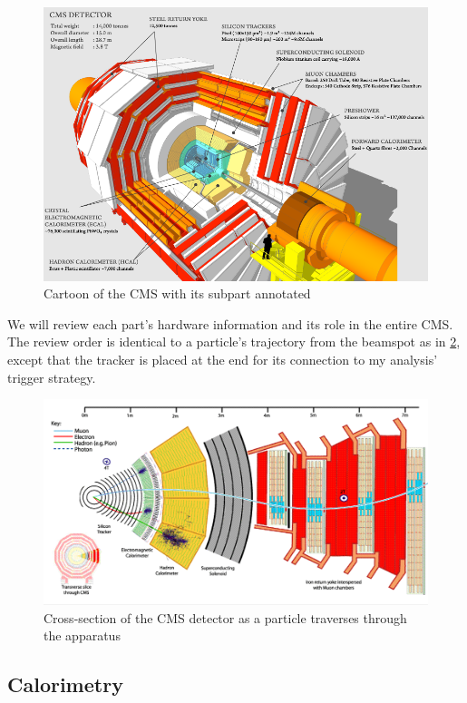 \begin{figure}[h!]
	\caption{Cartoon of the CMS with its subpart annotated \cite{xsec}}
  \label{fig:CMS}
  \centering
  \includegraphics[width=0.87\linewidth]{figs/CMS.png}
\end{figure}
We will review each part's hardware information and its role in the entire CMS.
The review order is identical to a particle's trajectory from the beamspot as in \ref{fig:cmsxsec}, except that the tracker is placed at the end for its connection to my analysis' trigger strategy.
\begin{figure}[h!]
  \caption{Cross-section of the CMS detector as a particle traverses through the apparatus \cite{xsec}}
  \label{fig:cmsxsec}
  \centering
  \includegraphics[width=0.87\linewidth]{figs/cmsxsec.png}
\end{figure}
\subsection{Calorimetry}
